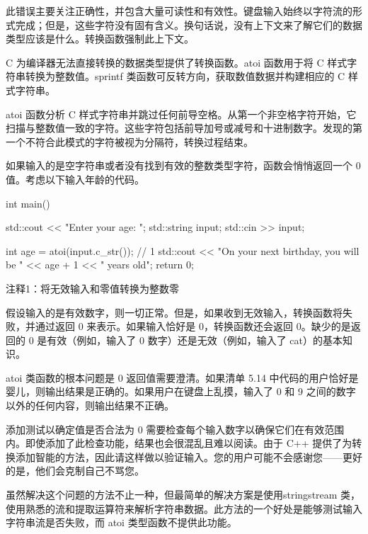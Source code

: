 此错误主要关注正确性，并包含大量可读性和有效性。键盘输入始终以字符流的形式完成；但是，这些字符没有固有含义。换句话说，没有上下文来了解它们的数据类型应该是什么。转换函数强制此上下文。

C 为编译器无法直接转换的数据类型提供了转换函数。atoi 函数用于将 C 样式字符串转换为整数值。sprintf 类函数可反转方向，获取数值数据并构建相应的 C 样式字符串。


atoi 函数分析 C 样式字符串并跳过任何前导空格。从第一个非空格字符开始，它扫描与整数值一致的字符。这些字符包括前导加号或减号和十进制数字。发现的第一个不符合此模式的字符被视为分隔符，转换过程结束。

如果输入的是空字符串或者没有找到有效的整数类型字符，函数会悄悄返回一个 0 值。考虑以下输入年龄的代码。


\begin{cpp}
int main() {
  std::cout << "Enter your age: ";
  std::string input;
  std::cin >> input;

  int age = atoi(input.c_str()); // 1
  std::cout << "On your next birthday, you will be " << age + 1 << " years
  old\n";
  return 0;
}
\end{cpp}

{\footnotesize
注释1：将无效输入和零值转换为整数零
}

假设输入的是有效数字，则一切正常。但是，如果收到无效输入，转换函数将失败，并通过返回 0 来表示。如果输入恰好是 0，转换函数还会返回 0。缺少的是返回的 0 是有效（例如，输入了 0 数字）还是无效（例如，输入了 cat）的基本知识。


atoi 类函数的根本问题是 0 返回值需要澄清。如果清单 5.14 中代码的用户恰好是婴儿，则输出结果是正确的。如果用户在键盘上乱摸，输入了 0 和 9 之间的数字以外的任何内容，则输出结果不正确。

添加测试以确定值是否合法为 0 需要检查每个输入数字以确保它们在有效范围内。即使添加了此检查功能，结果也会很混乱且难以阅读。由于 C++ 提供了为转换添加智能的方法，因此请这样做以验证输入。您的用户可能不会感谢您——更好的是，他们会克制自己不骂您。


虽然解决这个问题的方法不止一种，但最简单的解决方案是使用stringstream 类，使用熟悉的流和提取运算符来解析字符串数据。此方法的一个好处是能够测试输入字符串流是否失败，而 atoi 类型函数不提供此功能。


